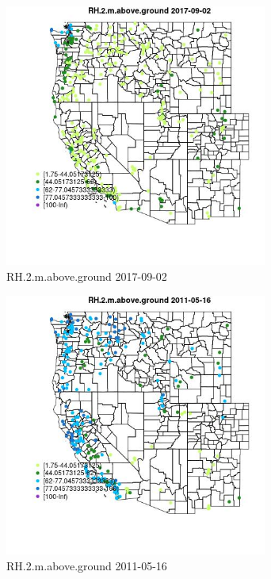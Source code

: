 \begin{figure} 
\centering  
\includegraphics[width=0.77\textwidth]{Code_Outputs/Report_ML_input_PM25_Step4_part_e_de_duplicated_aves_compiled_2019-05-21wNAs_MapObsRH2maboveground2017-09-02.jpg} 
\caption{\label{fig:Report_ML_input_PM25_Step4_part_e_de_duplicated_aves_compiled_2019-05-21wNAsMapObsRH2maboveground2017-09-02}RH.2.m.above.ground 2017-09-02} 
\end{figure} 
 

\clearpage 

\begin{figure} 
\centering  
\includegraphics[width=0.77\textwidth]{Code_Outputs/Report_ML_input_PM25_Step4_part_e_de_duplicated_aves_compiled_2019-05-21wNAs_MapObsRH2maboveground2011-05-16.jpg} 
\caption{\label{fig:Report_ML_input_PM25_Step4_part_e_de_duplicated_aves_compiled_2019-05-21wNAsMapObsRH2maboveground2011-05-16}RH.2.m.above.ground 2011-05-16} 
\end{figure} 
 

